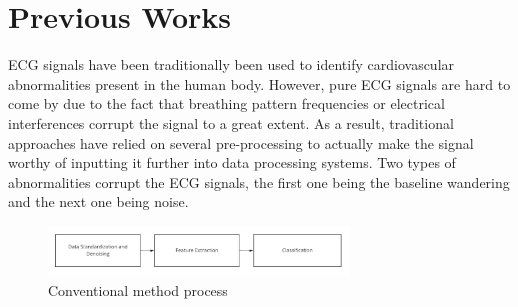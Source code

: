\documentclass[10pt,twocolumn,letterpaper]{article}
\begin{document}
\section{Previous Works}
ECG signals have been traditionally been used to identify cardiovascular abnormalities present in the human body. However, pure ECG signals are hard to come by due to the fact that breathing pattern frequencies or electrical interferences corrupt the signal to a great extent. As a result, traditional approaches have relied on several pre-processing to actually make the signal worthy of inputting it further into data processing systems. Two types of abnormalities corrupt the ECG signals, the first one being the baseline wandering and the next one being noise. 

\begin{figure}[htbp]
\includegraphics[width=8cm]{traditional.png}
\caption{Conventional method process}
\label{Conventional Method}
\end{figure}
\end{document}
